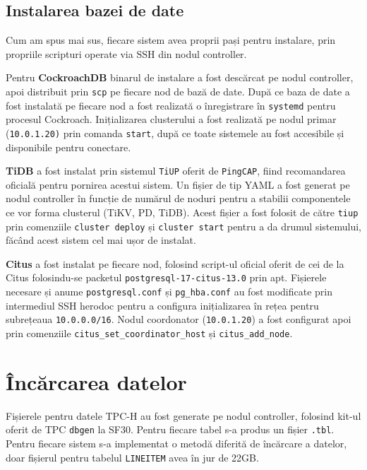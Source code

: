 \subsection{Instalarea bazei de date}

Cum am spus mai sus, fiecare sistem avea proprii pași pentru instalare, prin propriile scripturi operate via SSH din nodul controller.

Pentru \textbf{CockroachDB} binarul de instalare a fost descărcat pe nodul controller, apoi distribuit prin \texttt{scp} pe fiecare nod de bază de date. După ce baza de date a fost instalată pe fiecare nod a fost realizată o înregistrare în \texttt{systemd} pentru procesul Cockroach. Inițializarea clusterului a fost realizată pe nodul primar (\texttt{10.0.1.20)} prin comanda \texttt{start}, după ce toate sistemele au fost accesibile și disponibile pentru conectare.

\textbf{TiDB} a fost instalat prin sistemul \texttt{TiUP} oferit de \texttt{PingCAP}, fiind recomandarea oficială pentru pornirea acestui sistem. Un fișier de tip YAML a fost generat pe nodul controller în funcție de numărul de noduri pentru a stabilii componentele ce vor forma clusterul (TiKV, PD, TiDB). Acest fișier a fost folosit de către \texttt{tiup} prin comenziile \texttt{cluster deploy} și \texttt{cluster start} pentru a da drumul sistemului, făcând acest sistem cel mai ușor de instalat.

\textbf{Citus} a fost instalat pe fiecare nod, folosind script-ul oficial oferit de cei de la Citus folosindu-se packetul \texttt{postgresql-17-citus-13.0} prin apt. Fișierele necesare și anume \texttt{postgresql.conf} și \texttt{pg\_hba.conf} au fost modificate prin intermediul SSH herodoc pentru a configura inițializarea în rețea pentru subrețeaua \texttt{10.0.0.0/16}. Nodul coordonator (\texttt{10.0.1.20}) a fost configurat apoi prin comenziile \texttt{citus\_set\_coordinator\_host} și \texttt{citus\_add\_node}.

\section{Încărcarea datelor}

Fișierele pentru datele TPC-H au fost generate pe nodul controller, folosind kit-ul oferit de TPC \texttt{dbgen} la SF30. Pentru fiecare tabel s-a produs un fișier \texttt{.tbl}. Pentru fiecare sistem s-a implementat o metodă diferită de încărcare a datelor, doar fișierul pentru tabelul \texttt{LINEITEM} avea în jur de 22GB.

